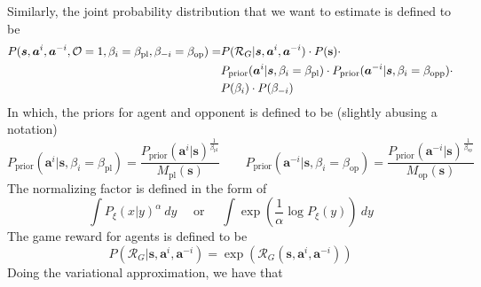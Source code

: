 Similarly, the joint probability distribution that we want to estimate is defined to be 
\begin{equation}
    \begin{aligned}
        P(\boldsymbol{s}, \boldsymbol{a}^i, \boldsymbol{a}^{-i}, \mathcal{O} = 1, \beta_i = \beta_{\text{pl}}, \beta_{-i} = \beta_{\text{op}}) = &P(\mathcal{R}_G | \boldsymbol{s}, \boldsymbol{a}^i, \boldsymbol{a}^{-i})\cdot P(\bold{s}) \cdot \\
        &P_{\text{prior}}(\boldsymbol{a}^i | \boldsymbol{s}, \beta_i = \beta_{\text{pl}}) \cdot P_{\text{prior}}(\boldsymbol{a}^{-i} | \boldsymbol{s}, \beta_i = \beta_{\text{opp}}) \cdot \\
        &P(\beta_i) \cdot P(\beta_{-i})
    \end{aligned}
\end{equation}
In which, the priors for agent and opponent is defined to be (slightly abusing a notation)
\begin{equation}
    P_{\text{prior}}(\boldsymbol{a}^i | \boldsymbol{s}, \beta_i = \beta_{\text{pl}}) = \frac{P_{\text{prior}}(\boldsymbol{a}^i | \boldsymbol{s})^{\frac{1}{\beta_{\text{pl}}}}}{M_{\text{pl}}(\boldsymbol{s})} \quad \quad P_{\text{prior}}(\boldsymbol{a}^{-i} | \boldsymbol{s}, \beta_i = \beta_{\text{op}}) = \frac{P_{\text{prior}}(\boldsymbol{a}^{-i} | \boldsymbol{s})^{\frac{1}{\beta_{\text{op}}}}}{M_{\text{op}}(\boldsymbol{s})}
\end{equation}
The normalizing factor is defined in the form of 
\begin{equation}
    \int P_{\xi}(x | y)^{\alpha} \ dy \quad \text{ or } \quad \int \exp\left(\frac{1}{\alpha} \log P_{\xi}(y)\right) \ dy 
\end{equation}
The game reward for agents is defined to be 
\begin{equation}
    P(\mathcal{R}_G | \boldsymbol{s}, \boldsymbol{a}^i, \boldsymbol{a}^{-i}) = \exp \left( \mathcal{R}_{G}(\boldsymbol{s}, \boldsymbol{a}^i, \boldsymbol{a}^{-i}) \right)
\end{equation}
Doing the variational approximation, we have that 
